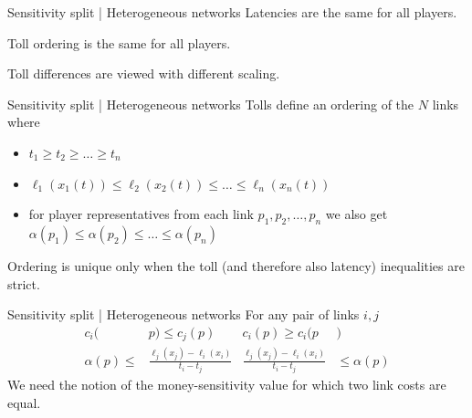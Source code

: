 \documentclass[handout]{beamer}
\begin{document}
\begin{frame}{Sensitivity split | Heterogeneous networks}
	Latencies are the same for all players.

	Toll ordering is the same for all players.

	Toll differences are viewed with different scaling.
	\\[15pt]
\end{frame}

\begin{frame}{Sensitivity split | Heterogeneous networks}
	Tolls define an ordering of the $N$ links where
	\begin{itemize}
		\item $t_1 \ge t_2 \ge \dots \ge t_n$
		\item $\ell_1(x_1(t)) \le \ell_2(x_2(t)) \le \dots \le \ell_n(x_n(t))$
		\item for player representatives from each link $p_1, p_2, \dots, p_n$ we also get $\alpha(p_1) \le \alpha(p_2) \le \dots \le \alpha(p_n)$
	\end{itemize}
	Ordering is unique only when the toll (and therefore also latency) inequalities are strict.
\end{frame}

\begin{frame}{Sensitivity split | Heterogeneous networks}
	For any pair of links $i, j$
	\begin{align*}
		c_i(&p) \le c_j(p) & c_i(p) \ge c_i(p&) \\[10pt]
		\alpha(p) \le &\frac{\ell_j(x_j) - \ell_i(x_i)}{t_i - t_j} & \frac{\ell_j(x_j) - \ell_i(x_i)}{t_i - t_j}& \le \alpha(p)
	\end{align*}
	We need the notion of the money-sensitivity value for which two link costs are equal.
\end{frame}
\end{document}

